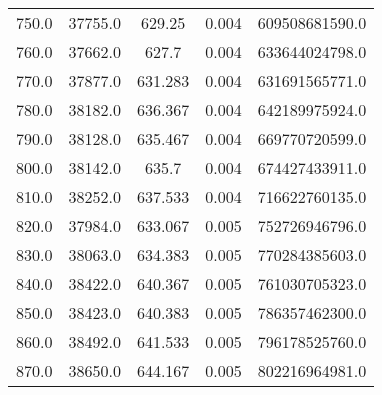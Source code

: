\begin{table}
\begin{tabular}{ccccc}
750.0 & 37755.0 & 629.25 & 0.004 & 609508681590.0 \\
760.0 & 37662.0 & 627.7 & 0.004 & 633644024798.0 \\
770.0 & 37877.0 & 631.283 & 0.004 & 631691565771.0 \\
780.0 & 38182.0 & 636.367 & 0.004 & 642189975924.0 \\
790.0 & 38128.0 & 635.467 & 0.004 & 669770720599.0 \\
800.0 & 38142.0 & 635.7 & 0.004 & 674427433911.0 \\
810.0 & 38252.0 & 637.533 & 0.004 & 716622760135.0 \\
820.0 & 37984.0 & 633.067 & 0.005 & 752726946796.0 \\
830.0 & 38063.0 & 634.383 & 0.005 & 770284385603.0 \\
840.0 & 38422.0 & 640.367 & 0.005 & 761030705323.0 \\
850.0 & 38423.0 & 640.383 & 0.005 & 786357462300.0 \\
860.0 & 38492.0 & 641.533 & 0.005 & 796178525760.0 \\
870.0 & 38650.0 & 644.167 & 0.005 & 802216964981.0 \\
\end{tabular}
\end{table}

